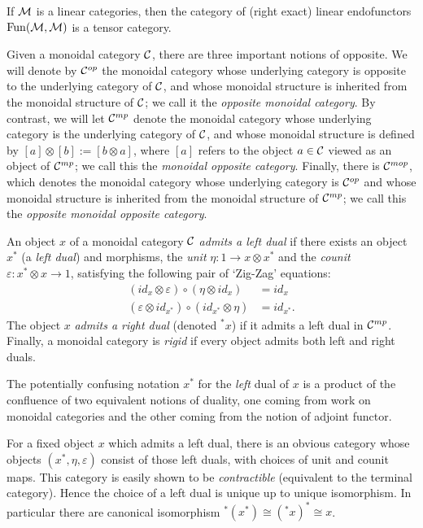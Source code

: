 \documentclass{amsart}
\begin{document}
\begin{example}
	If $\mathcal M$ is a linear categories, then the category of (right exact) linear endofunctors $\operatorname{Fun}(\mathcal M, \mathcal M)$ is a tensor category. 
\end{example}

Given a monoidal category $\mathcal C$, there are three important notions of opposite. We will denote by $\mathcal C^{{op}}$ the monoidal category whose underlying category is opposite to the underlying  category of $\mathcal C$, and whose monoidal structure is inherited from the monoidal structure of $\mathcal C$; we call it the {\em opposite monoidal category}.  By contrast, we will let $\mathcal C^{{mp}}$ denote the monoidal category whose underlying category is the underlying category of $\mathcal C$, and whose monoidal structure is defined by $[a] \otimes [b] := [b \otimes a]$, where $[a]$ refers to the object $a \in \mathcal C$ viewed as an object of $\mathcal C^{{mp}}$; we call this the {\em monoidal opposite category}.  Finally, there is $\mathcal C^{{mop}}$, which denotes the monoidal category whose underlying  category is $\mathcal C^{{op}}$ and whose monoidal structure is inherited from the monoidal structure of $\mathcal C^{{mp}}$; we call this the {\em opposite monoidal opposite category}.

\begin{definition}
	An object $x$ of a monoidal category $\mathcal C$ {\em admits a left dual} if there exists an object $x^*$ (a {\em left dual}) and morphisms, the {\em unit} $\eta: 1 \to x \otimes x^*$ and the {\em counit} $\varepsilon: x^* \otimes x \to 1$, satisfying the following pair of `Zig-Zag' equations:
	\begin{align*}
		(id_{x} \otimes \varepsilon  ) \circ (  \eta \otimes id_{x}) &= id_{x} \\
		(\varepsilon \otimes id_{x^*}) \circ (id_{x^*} \otimes \eta) &= id_{x^*}.
	\end{align*}
The object $x$ {\em admits a right dual} (denoted ${}^*x$) if it admits a left dual in $\mathcal C^{mp}$. Finally, a monoidal category is {\em rigid} if every object admits both left and right duals. 
\end{definition}

\begin{remark}
	The potentially confusing notation $x^*$ for the {\em left} dual of $x$ is a product of the confluence of two equivalent notions of duality, one coming from work on monoidal categories and the other coming from the notion of adjoint functor.  
\end{remark}

\begin{remark}
	For a fixed object $x$ which admits a left dual, there is an obvious category whose objects $(x^*, \eta, \varepsilon)$ consist of those left duals, with choices of unit and counit maps. This category is easily shown to be {\em contractible} (equivalent to the terminal category). Hence the choice of a left dual is unique up to unique isomorphism. In particular there are canonical isomorphism ${}^*(x^*) \cong ({}^*x)^* \cong x$. 
\end{remark}
\end{document}
